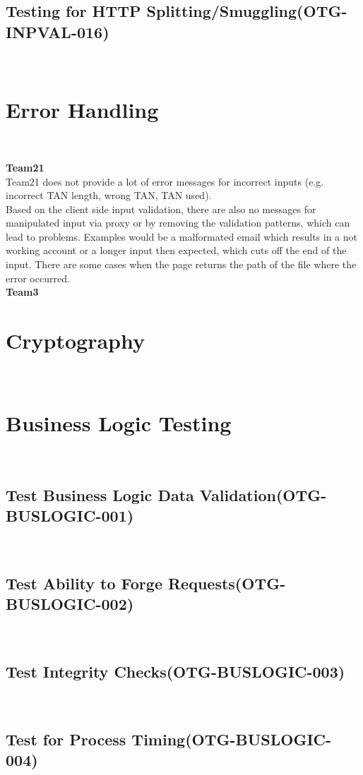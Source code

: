 \documentclass[headsepline,footsepline,footinclude=false,oneside,fontsize=11pt,paper=a4,listof=totoc,bibliography=totoc]{scrbook} %
\begin{document}
\subsection{Testing for HTTP Splitting/Smuggling(OTG-INPVAL-016)}\

\section{Error Handling}\

\textbf{Team21}\\

Team21 does not provide a lot of error messages for incorrect inputs (e.g. incorrect TAN
length, wrong TAN, TAN used). \\ 
Based on the client side input validation, there are also no messages for manipulated input via proxy or by removing the validation patterns, which can lead to problems. Examples would be a malformated email which results in a not working account or a longer input then expected, which cuts off the end of the input. There are some cases when the page returns the path of the file where the error occurred.\\   
 
\textbf{Team3}\\


\section{Cryptography}\
 
\pagebreak 
\section{Business Logic Testing}\
\subsection{Test Business Logic Data Validation(OTG-BUSLOGIC-001)}\
\pagebreak 
\subsection{Test Ability to Forge Requests(OTG-BUSLOGIC-002)}\
\pagebreak 
\subsection{Test Integrity Checks(OTG-BUSLOGIC-003)}\
\pagebreak 
\subsection{Test for Process Timing(OTG-BUSLOGIC-004)}\
\pagebreak 
\end{document}
